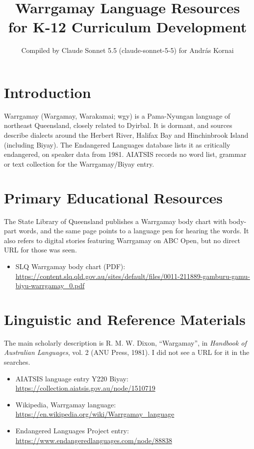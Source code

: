 \documentclass[12pt]{article}
\title{Warrgamay Language Resources for K-12 Curriculum Development}
\author{Compiled by Claude Sonnet 5.5 (claude-sonnet-5-5) for Andr\'as Kornai}
\date{}
\begin{document}
\maketitle

\section{Introduction}
Warrgamay (Wargamay, Warakamai; wgy) is a Pama-Nyungan language of northeast Queensland, closely related to Dyirbal. It is dormant, and sources describe dialects around the Herbert River, Halifax Bay and Hinchinbrook Island (including Biyay). The Endangered Languages database lists it as critically endangered, on speaker data from 1981. AIATSIS records no word list, grammar or text collection for the Warrgamay/Biyay entry.

\section{Primary Educational Resources}
The State Library of Queensland publishes a Warrgamay body chart with body-part words, and the same page points to a language pen for hearing the words. It also refers to digital stories featuring Warrgamay on ABC Open, but no direct URL for those was seen.
\begin{itemize}
\item SLQ Warrgamay body chart (PDF): \url{https://content.slq.qld.gov.au/sites/default/files/0011-211889-gamburu-gamu-biyu-warrgamay_0.pdf}
\end{itemize}

\section{Linguistic and Reference Materials}
The main scholarly description is R. M. W. Dixon, ``Wargamay'', in \emph{Handbook of Australian Languages}, vol. 2 (ANU Press, 1981). I did not see a URL for it in the searches.
\begin{itemize}
\item AIATSIS language entry Y220 Biyay: \url{https://collection.aiatsis.gov.au/node/1510719}
\item Wikipedia, Warrgamay language: \url{https://en.wikipedia.org/wiki/Warrgamay_language}
\item Endangered Languages Project entry: \url{https://www.endangeredlanguages.com/node/88838}
\end{itemize}
\end{document}
